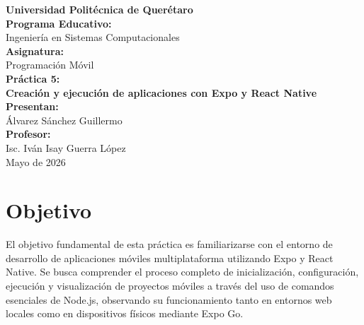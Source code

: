 \documentclass[12pt,a4paper]{article}
\begin{document}
\begin{titlepage}
    \centering
    \vspace*{2cm}
    
    {\Huge \textbf{Universidad Politécnica de Querétaro}}\\[1.5cm]
    
    {\Large \textbf{Programa Educativo:}}\\
    {\large Ingeniería en Sistemas Computacionales}\\[1cm]
    
    {\Large \textbf{Asignatura:}}\\
    {\large Programación Móvil}\\[1.5cm]
    
    {\Large \textbf{Práctica 5:}}\\
    {\large \textbf{Creación y ejecución de aplicaciones con Expo y React Native}}\\[2cm]
    
    {\Large \textbf{Presentan:}}\\
    {\large Álvarez Sánchez Guillermo}\\[1.5cm]
    
    {\Large \textbf{Profesor:}}\\
    {\large Isc. Iván Isay Guerra López}\\[2cm]
    
    {\large Mayo de 2026}
    \vfill
\end{titlepage}

\newpage
\tableofcontents
\newpage

\section{Objetivo}
El objetivo fundamental de esta práctica es familiarizarse con el entorno de desarrollo de aplicaciones móviles multiplataforma utilizando Expo y React Native. Se busca comprender el proceso completo de inicialización, configuración, ejecución y visualización de proyectos móviles a través del uso de comandos esenciales de Node.js, observando su funcionamiento tanto en entornos web locales como en dispositivos físicos mediante Expo Go.
\end{document}

